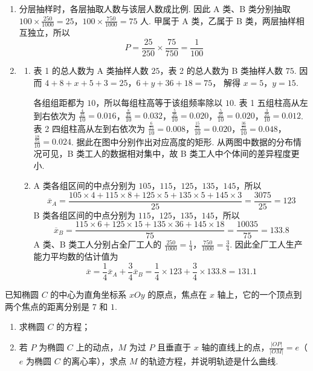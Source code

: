 \begin{solution}
\begin{enumerate}
\item 分层抽样时，各层抽取人数与该层人数成比例. 因此 A 类、B 类分别抽取
\(100\times\frac{250}{1000}=25\)，\(100\times\frac{750}{1000}=75\)
人. 甲属于 A 类，乙属于 B 类，两层抽样相互独立，所以
\[
P=\frac{25}{250}\times\frac{75}{750}=\frac{1}{100}
\]

\item
\begin{enumerate}
\item 表 1 的总人数为 A 类抽样人数 \(25\)，表 2 的总人数为 B 类抽样人数 \(75\). 因而
\(4+8+x+5+3=25\)，\(6+y+36+18=75\)，
解得
\(x=5\)，\(y=15\).

各组组距都为 \(10\)，所以每组柱高等于该组频率除以 \(10\). 表 1 五组柱高从左到右依次为
\(\frac{\frac{4}{25}}{10}=0.016\)，\(\frac{\frac{8}{25}}{10}=0.032\)，\(\frac{\frac{5}{25}}{10}=0.020\)，\(\frac{\frac{5}{25}}{10}=0.020\)，\(\frac{\frac{3}{25}}{10}=0.012\).
表 2 四组柱高从左到右依次为
\(\frac{\frac{6}{75}}{10}=0.008\)，\(\frac{\frac{15}{75}}{10}=0.020\)，\(\frac{\frac{36}{75}}{10}=0.048\)，\(\frac{\frac{18}{75}}{10}=0.024\).
据此在图中分别作出对应高度的矩形. 从两图中数据的分布情况可见，B 类工人的数据相对集中，故 B 类工人中个体间的差异程度更小.

\item A 类各组区间的中点分别为 \(105\)，\(115\)，\(125\)，\(135\)，\(145\)，所以
\[
\overline{x}_{A}=\frac{105\times4+115\times8+125\times5+135\times5+145\times3}{25}=\frac{3075}{25}=123
\]
B 类各组区间的中点分别为 \(115\)，\(125\)，\(135\)，\(145\)，所以
\[
\overline{x}_{B}=\frac{115\times6+125\times15+135\times36+145\times18}{75}=\frac{10035}{75}=133.8
\]
A 类、B 类工人分别占全厂工人的
\(\frac{250}{1000}=\frac14\)，\(\frac{750}{1000}=\frac34\).
因此全厂工人生产能力平均数的估计值为
\[
\overline{x}=\frac14\overline{x}_{A}+\frac34\overline{x}_{B}=\frac14\times123+\frac34\times133.8=131.1
\]
\end{enumerate}
\end{enumerate}
\end{solution}

\begin{problem}
已知椭圆 \(C\) 的中心为直角坐标系 \(xOy\) 的原点，焦点在 \(x\) 轴上，它的一个顶点到两个焦点的距离分别是 \(7\) 和 \(1\).

\begin{enumerate}
\item 求椭圆 \(C\) 的方程；
\item 若 \(P\) 为椭圆 \(C\) 上的动点，\(M\) 为过 \(P\) 且垂直于 \(x\) 轴的直线上的点，\(\frac{|OP|}{|OM|} = e\)（\(e\) 为椭圆 \(C\) 的离心率），求点 \(M\) 的轨迹方程，并说明轨迹是什么曲线.
\end{enumerate}
\end{problem}

